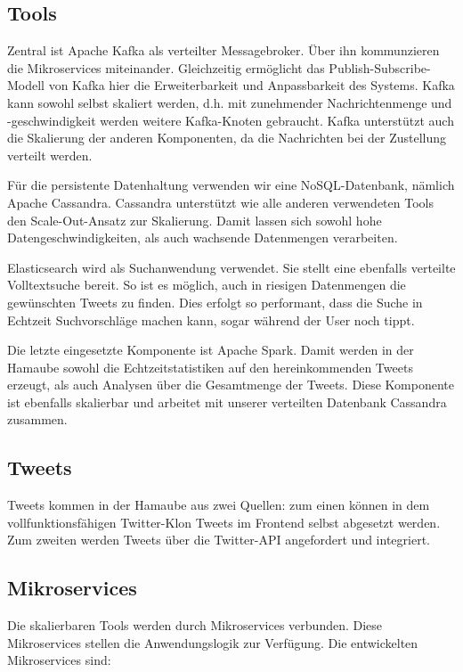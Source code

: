 \subsection{Tools}
Zentral ist Apache Kafka als verteilter Messagebroker. Über ihn
kommunzieren die Mikroservices miteinander. Gleichzeitig ermöglicht das
Publish-Subscribe-Modell von Kafka hier die Erweiterbarkeit und
Anpassbarkeit des Systems. Kafka  kann sowohl selbst skaliert werden,
d.h. mit zunehmender Nachrichtenmenge und -geschwindigkeit werden
weitere Kafka-Knoten gebraucht. Kafka unterstützt auch die Skalierung
der anderen Komponenten, da die Nachrichten bei der Zustellung verteilt
werden.

Für die persistente Datenhaltung verwenden wir eine NoSQL-Datenbank, nämlich
Apache Cassandra. Cassandra unterstützt wie alle anderen verwendeten
Tools den Scale-Out-Ansatz zur Skalierung. Damit lassen sich sowohl
hohe Datengeschwindigkeiten, als auch wachsende Datenmengen
verarbeiten.

Elasticsearch wird als Suchanwendung verwendet. Sie stellt eine
ebenfalls verteilte Volltextsuche bereit. So ist es möglich, auch in
riesigen Datenmengen die gewünschten Tweets zu finden. Dies erfolgt so
performant, dass die Suche in Echtzeit Suchvorschläge machen kann,
sogar während der User noch tippt.

Die letzte eingesetzte Komponente ist Apache Spark. Damit werden in der
Hamaube sowohl die Echtzeitstatistiken auf den hereinkommenden Tweets
erzeugt, als auch Analysen über die Gesamtmenge der Tweets. Diese
Komponente ist ebenfalls skalierbar und arbeitet mit unserer verteilten
Datenbank Cassandra zusammen.

\subsection{Tweets}
Tweets kommen in der Hamaube aus zwei Quellen: zum einen können in dem
vollfunktionsfähigen Twitter-Klon Tweets im Frontend selbst abgesetzt
werden. Zum zweiten werden Tweets über die Twitter-API angefordert und
integriert.

\subsection{Mikroservices}
Die skalierbaren Tools werden durch Mikroservices verbunden. Diese
Mikroservices stellen die Anwendungslogik zur Verfügung. Die
entwickelten Mikroservices sind:

